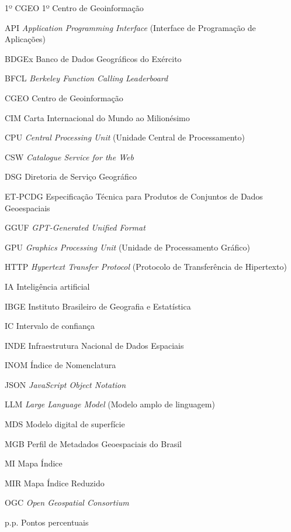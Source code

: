 \begin{siglas}
  \item[1º CGEO] 1º Centro de Geoinformação
  \item[API]     \textit{Application Programming Interface} (Interface de Programação de Aplicações)
  \item[BDGEx]   Banco de Dados Geográficos do Exército
  \item[BFCL]    \textit{Berkeley Function Calling Leaderboard}
  \item[CGEO]    Centro de Geoinformação
  \item[CIM]     Carta Internacional do Mundo ao Milionésimo
  \item[CPU]     \textit{Central Processing Unit} (Unidade Central de Processamento)
  \item[CSW]     \textit{Catalogue Service for the Web}
  \item[DSG]     Diretoria de Serviço Geográfico
  \item[ET-PCDG] Especificação Técnica para Produtos de Conjuntos de Dados Geoespaciais
  \item[GGUF]    \textit{GPT-Generated Unified Format}
  \item[GPU]     \textit{Graphics Processing Unit} (Unidade de Processamento Gráfico)
  \item[HTTP]    \textit{Hypertext Transfer Protocol} (Protocolo de Transferência de Hipertexto)
  \item[IA]      Inteligência artificial
  \item[IBGE]    Instituto Brasileiro de Geografia e Estatística
  \item[IC]      Intervalo de confiança
  \item[INDE]    Infraestrutura Nacional de Dados Espaciais
  \item[INOM]    Índice de Nomenclatura
  \item[JSON]    \textit{JavaScript Object Notation}
  \item[LLM]     \textit{Large Language Model} (Modelo amplo de linguagem)
  \item[MDS]     Modelo digital de superfície
  \item[MGB]     Perfil de Metadados Geoespaciais do Brasil
  \item[MI]      Mapa Índice
  \item[MIR]     Mapa Índice Reduzido
  \item[OGC]     \textit{Open Geospatial Consortium}
  \item[p.p.]    Pontos percentuais

\end{siglas}
